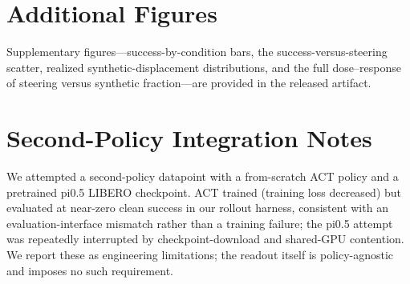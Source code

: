 \section{Additional Figures}
\label{app:figs}
Supplementary figures---success-by-condition bars, the success-versus-steering scatter,
realized synthetic-displacement distributions, and the full dose--response of steering
versus synthetic fraction---are provided in the released artifact.

\section{Second-Policy Integration Notes}
\label{app:2ndpolicy}
We attempted a second-policy datapoint with a from-scratch ACT policy and a pretrained
pi0.5 LIBERO checkpoint. ACT trained (training loss decreased) but evaluated at near-zero
clean success in our rollout harness, consistent with an evaluation-interface mismatch
rather than a training failure; the pi0.5 attempt was repeatedly interrupted by
checkpoint-download and shared-GPU contention. We report these as engineering limitations;
the readout itself is policy-agnostic and imposes no such requirement.
